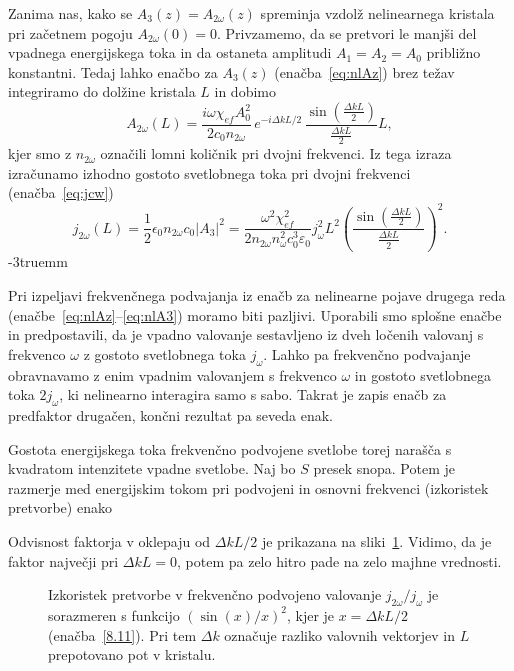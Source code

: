 Zanima nas, kako se $A_{3}(z) = A_{2\omega}(z)$ spreminja vzdolž nelinearnega kristala
pri začetnem pogoju $A_{2\omega}(0)=0$.
Privzamemo, da se pretvori le manjši del vpadnega energijskega toka in da ostaneta 
amplitudi $A_{1}=A_{2}=A_0$ približno konstantni. Tedaj lahko
enačbo za $A_{3}(z)$ (enačba~\ref{eq:nlAz}) brez težav integriramo do dolžine kristala $L$ in 
dobimo
\begin{equation}
A_{2\omega}(L)=\frac{i\omega \chi_{ef} A_0^2}{2c_0 n_{2\omega}}
\,e^{-i\Delta kL/2}\, \frac{\sin\left(\frac{\Delta k L}{2}\right)}{\frac{\Delta kL}{2}}L,
\label{8.9}
\end{equation}
kjer smo z $n_{2\omega}$ označili lomni količnik pri dvojni frekvenci.
Iz tega izraza izračunamo izhodno gostoto svetlobnega toka pri dvojni
frekvenci (enačba~\ref{eq:jcw})
\begin{equation}
j_{2\omega}(L) =\frac{1}{2}\epsilon_{0}n_{2\omega}c_0|A_3|^2 = 
\frac{\omega^2 \chi_{ef}^2}{2 n_{2\omega} n_\omega^2c_0^3\varepsilon_0} j_\omega^2 L^2
\left(\frac{\sin\left(\frac{\Delta k L}{2}\right)}{\frac{\Delta kL}{2}}\right)^2.
\label{8.10}
\end{equation}
\vglue-3truemm
\begin{remark}
Pri izpeljavi frekvenčnega podvajanja iz enačb za nelinearne pojave drugega
reda (enačbe~\ref{eq:nlAz}--\ref{eq:nlA3}) moramo biti pazljivi. 
Uporabili smo splošne enačbe in predpostavili, da je 
vpadno valovanje se\-stav\-lje\-no iz dveh ločenih valovanj s frekvenco $\omega$
z gostoto svetlobnega toka $j_\omega$. Lahko pa frekvenčno podvajanje obravnavamo
z enim vpadnim valovanjem s frekvenco $\omega$ in gostoto svetlobnega toka $2j_\omega$, 
ki nelinearno interagira samo s sabo. Takrat je zapis enačb za predfaktor
drugačen, končni rezultat pa seveda enak. 
\end{remark}

Gostota energijskega toka frekvenčno podvojene svetlobe torej narašča s kvadratom
intenzitete vpadne svetlobe. Naj bo $S$ presek snopa. Potem je razmerje med 
energijskim tokom pri podvojeni in osnovni frekvenci (izkoristek pretvorbe) enako

Odvisnost faktorja v oklepaju od $\Delta kL/2$ je prikazana 
na sliki~\ref{fig:shg2}. Vidimo, da je faktor največji pri $\Delta kL = 0$, potem pa zelo hitro
pade na zelo majhne vrednosti. 
\begin{figure}[h]
\centering
\def\svgwidth{72truemm} 

\caption{Izkoristek pretvorbe v frekvenčno podvojeno valovanje $j_{2\omega}/j_\omega$ je 
sorazmeren s funkcijo $(\sin(x)/x)^2$,
kjer je $x = \Delta k L/2$ (enačba~\ref{8.11}). 
Pri tem $\Delta k$ označuje razliko valovnih vektorjev in
$L$ prepotovano pot v kristalu.}
\label{fig:shg2}
\end{figure}

